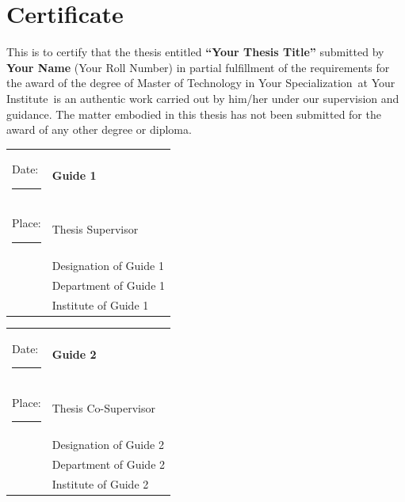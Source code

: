 \documentclass[12pt,a4paper]{report}
\newcommand{\thesistitle}{Your Thesis Title}
\newcommand{\authorname}{Your Name}
\newcommand{\rollnumber}{Your Roll Number}
\newcommand{\guideIname}{Guide 1}
\newcommand{\guideItitle}{Designation of Guide 1}
\newcommand{\guideIdept}{Department of Guide 1}
\newcommand{\guideIinst}{Institute of Guide 1}
\newcommand{\guideIIname}{Guide 2}
\newcommand{\guideIItitle}{Designation of Guide 2}
\newcommand{\guideIIdept}{Department of Guide 2}
\newcommand{\guideIIinst}{Institute of Guide 2}
\newcommand{\institutename}{Your Institute}
\newcommand{\specialization}{Your Specialization}
\begin{document}
\cleardoublepage
\chapter*{Certificate}

This is to certify that the thesis entitled \textbf{``\thesistitle''} submitted by \textbf{\authorname} (\rollnumber) in partial fulfillment of the requirements for the award of the degree of Master of Technology in \specialization\ at \institutename\ is an authentic work carried out by him/her under our supervision and guidance.
The matter embodied in this thesis has not been submitted for the award of any other degree or diploma.
\vspace{1.5cm}

\noindent\begin{tabular}{@{}p{}p{}@{}}
Date: \rule{3cm}{0.4pt} & \hfill\textbf{\guideIname}\hspace{0pt}\\[0.2cm]
Place: \rule{3cm}{0.4pt} & \hfill Thesis Supervisor\hspace{0pt}\\[0.2cm]
& \hfill\guideItitle\hspace{0pt}\\[0.2cm]
& \hfill\guideIdept\hspace{0pt}\\[0.2cm]
& \hfill\guideIinst\hspace{0pt}
\end{tabular}

\vspace{1cm}

\noindent\begin{tabular}{@{}p{}p{}@{}}
Date: \rule{3cm}{0.4pt} & \hfill\textbf{\guideIIname}\hspace{0pt}\\[0.2cm]
Place: \rule{3cm}{0.4pt} & \hfill Thesis Co-Supervisor\hspace{0pt}\\[0.2cm]
& \hfill\guideIItitle\hspace{0pt}\\[0.2cm]
& \hfill\guideIIdept\hspace{0pt}\\[0.2cm]
& \hfill\guideIIinst\hspace{0pt}
\end{tabular}
\end{document}
